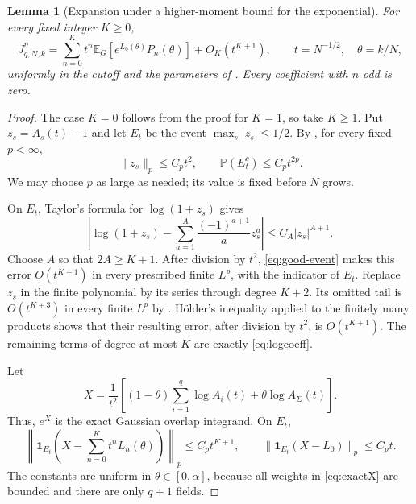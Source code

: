 \documentclass[11pt,reqno]{amsart}
\numberwithin{equation}{section}
\theoremstyle{plain}
\newtheorem{lemma}[lemma]{Lemma}
\theoremstyle{definition}
\newcommand{\E}{\mathbb E}
\newcommand{\Pb}{\mathbb P}
\begin{document}
\begin{lemma}[Expansion under a higher-moment bound for the exponential]\label{lem:expansion}
For every fixed integer $K\geq0$,
\begin{equation}\label{eq:expansion-half}
 J_{q,N,k}^{\eta}
 =\sum_{n=0}^{K} t^n\E_G[e^{L_0(\theta)}P_n(\theta)]
   +O_K(t^{K+1}),\qquad t=N^{-1/2},\quad\theta=k/N,
\end{equation}
uniformly in the cutoff and the parameters of . Every coefficient with $n$ odd is zero.
\end{lemma}
\begin{proof}
The case $K=0$ follows from the proof for $K=1$, so take $K\geq1$. Put $z_s=A_s(t)-1$ and let $E_t$ be the event $\max_s|z_s|\leq1/2$. By , for every fixed $p<\infty$,
\begin{equation}\label{eq:good-event}
 \|z_s\|_p\leq C_pt^2,\qquad
 \Pb(E_t^c)\leq C_pt^{2p}.
\end{equation}
We may choose $p$ as large as needed; its value is fixed before $N$ grows.

On $E_t$, Taylor's formula for $\log(1+z_s)$ gives
\begin{equation}\label{eq:log-error}
 \left|\log(1+z_s)-\sum_{a=1}^{A}\frac{(-1)^{a+1}}a z_s^a\right|
 \leq C_A|z_s|^{A+1}.
\end{equation}
Choose $A$ so that $2A\geq K+1$. After division by $t^2$, \eqref{eq:good-event} makes this error $O(t^{K+1})$ in every prescribed finite $L^p$, with the indicator of $E_t$. Replace $z_s$ in the finite polynomial by its series through degree $K+2$. Its omitted tail is $O(t^{K+3})$ in every finite $L^p$ by . H\"older's inequality applied to the finitely many products shows that their resulting error, after division by $t^2$, is $O(t^{K+1})$. The remaining terms of degree at most $K$ are exactly \eqref{eq:logcoeff}.

Let
\begin{equation}\label{eq:exactX}
 X=\frac1{t^2}\left[(1-\theta)\sum_{i=1}^q\log A_i(t)+\theta\log A_\Sigma(t)\right].
\end{equation}
Thus, $e^X$ is the exact Gaussian overlap integrand. On $E_t$,
\begin{equation}\label{eq:Delta}
 \left\|\mathbf1_{E_t}\left(X-\sum_{n=0}^{K}t^nL_n(\theta)\right)\right\|_p
 \leq C_pt^{K+1},\qquad
 \|\mathbf1_{E_t}(X-L_0)\|_p\leq C_pt.
\end{equation}
The constants are uniform in $\theta\in[0,\alpha]$, because all weights in \eqref{eq:exactX} are bounded and there are only $q+1$ fields.


\end{proof}
\end{document}
